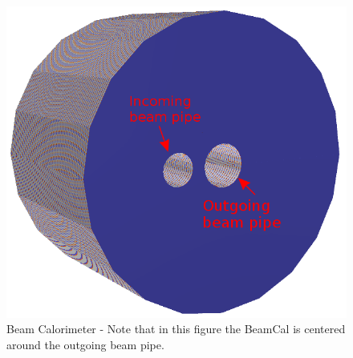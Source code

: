 \documentclass{report}
\begin{document}
\begin{figure}[h]
\begin{minipage}{0.4\textwidth}
                        \includegraphics[width=\textwidth]{beamcal_full}
                        \caption{Beam Calorimeter - Note that in this figure the BeamCal is centered around the outgoing beam pipe. }
                        \label{fig__beamcal}
                    \end{minipage}
                \end{figure}
                
\end{document}
